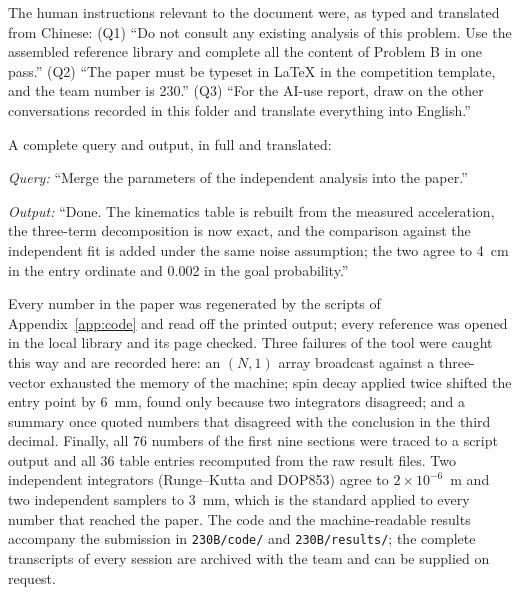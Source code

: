 The human instructions relevant to the document were, as typed and translated
from Chinese: (Q1) ``Do not consult any existing analysis of this problem. Use
the assembled reference library and complete all the content of Problem B in
one pass.'' (Q2) ``The paper must be typeset in \LaTeX{} in the competition
template, and the team number is 230.'' (Q3) ``For the AI-use report, draw on
the other conversations recorded in this folder and translate everything into
English.''

A complete query and output, in full and translated:

\smallskip
\noindent\emph{Query:} ``Merge the parameters of the independent analysis into
the paper.''
\par\noindent\emph{Output:} ``Done. The kinematics table is rebuilt from the
measured acceleration, the three-term decomposition is now exact, and the
comparison against the independent fit is added under the same noise
assumption; the two agree to 4~cm in the entry ordinate and 0.002 in the goal
probability.''
\smallskip

Every number in the paper was regenerated by the scripts of
Appendix~\ref{app:code} and read off the printed output; every reference was
opened in the local library and its page checked. Three failures of the tool
were caught this way and are recorded here: an $(N,1)$ array broadcast against
a three-vector exhausted the memory of the machine; spin decay applied twice
shifted the entry point by 6~mm, found only because two integrators disagreed;
and a summary once quoted numbers that disagreed with the conclusion in the
third decimal. Finally, all 76 numbers of the first nine sections were traced
to a script output and all 36 table entries recomputed from the raw result
files. Two independent integrators (Runge--Kutta and DOP853) agree to
$2\times10^{-6}$~m and two independent samplers to 3~mm, which is the standard
applied to every number that reached the paper. The code and the
machine-readable results accompany the submission in \texttt{230B/code/} and
\texttt{230B/results/}; the complete transcripts of every session are archived
with the team and can be supplied on request.
